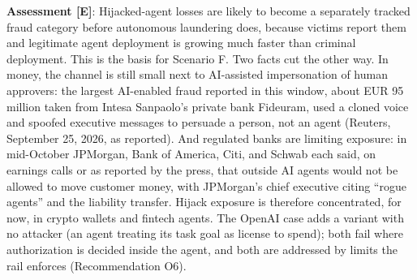 \documentclass[11pt,letterpaper]{article}
\begin{document}
\textbf{Assessment [E]}: Hijacked-agent losses are likely to become a separately tracked fraud category before autonomous laundering does, because victims report them and legitimate agent deployment is growing much faster than criminal deployment. This is the basis for Scenario F. Two facts cut the other way. In money, the channel is still small next to AI-assisted impersonation of human approvers: the largest AI-enabled fraud reported in this window, about EUR 95 million taken from Intesa Sanpaolo's private bank Fideuram, used a cloned voice and spoofed executive messages to persuade a person, not an agent (Reuters, September 25, 2026, as reported). And regulated banks are limiting exposure: in mid-October JPMorgan, Bank of America, Citi, and Schwab each said, on earnings calls or as reported by the press, that outside AI agents would not be allowed to move customer money, with JPMorgan's chief executive citing ``rogue agents'' and the liability transfer. Hijack exposure is therefore concentrated, for now, in crypto wallets and fintech agents. The OpenAI case adds a variant with no attacker (an agent treating its task goal as license to spend); both fail where authorization is decided inside the agent, and both are addressed by limits the rail enforces (Recommendation O6).
\end{document}
